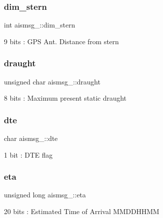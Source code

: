 \subsubsection{\texorpdfstring{dim\+\_\+stern}{dim\_stern}}
{\footnotesize\ttfamily int aismsg\+\_\+::dim\+\_\+stern}



9 bits \+: G\+PS Ant. Distance from stern 

\mbox{\label{structaismsg__5_ac135c36dd38e20510f22d48ec09fce72}} 
\subsubsection{\texorpdfstring{draught}{draught}}
{\footnotesize\ttfamily unsigned char aismsg\+\_\+::draught}



8 bits \+: Maximum present static draught 

\mbox{\label{structaismsg__5_af6a74c42fdd03f33226e241e21dcdcb4}} 
\subsubsection{\texorpdfstring{dte}{dte}}
{\footnotesize\ttfamily char aismsg\+\_\+::dte}



1 bit \+: D\+TE flag 

\mbox{\label{structaismsg__5_aedf0bb8fc2c7d57776258529c2d4f5be}} 
\subsubsection{\texorpdfstring{eta}{eta}}
{\footnotesize\ttfamily unsigned long aismsg\+\_\+::eta}



20 bits \+: Estimated Time of Arrival M\+M\+D\+D\+H\+H\+MM 

\mbox{\label{structaismsg__5_aa3c95a1bb3e2adb8749ed893a15783f8}} 
